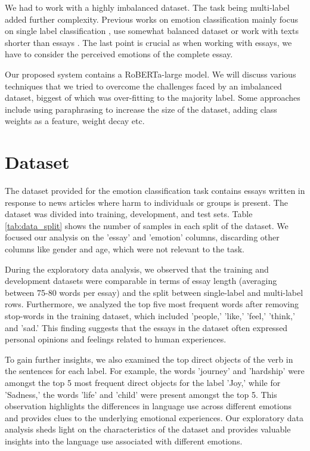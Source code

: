 \documentclass[11pt]{article}
\begin{document}
We had to work with a highly imbalanced dataset. The task being multi-label added further complexity. Previous works on emotion classification mainly focus on single label classification \citep{barriere2022wassa}, use somewhat balanced dataset \citep{demszky2020goemotions} or work with texts shorter than essays \citep{mohammad-2012-emotional}. The last point is crucial as when working with essays, we have to consider the perceived emotions of the complete essay.

Our proposed system contains a RoBERTa-large model. We will discuss various techniques that we tried to overcome the challenges faced by an imbalanced dataset, biggest of which was over-fitting to the majority label. Some approaches include using paraphrasing to increase the size of the dataset, adding class weights as a feature, weight decay etc.

\section{Dataset}

The dataset provided for the emotion classification task contains essays written in response to news articles where harm to individuals or groups is present. The dataset was divided into training, development, and test sets. Table \ref{tab:data_split} shows the number of samples in each split of the dataset. We focused our analysis on the 'essay' and 'emotion' columns, discarding other columns like gender and age, which were not relevant to the task.

During the exploratory data analysis, we observed that the training and development datasets were comparable in terms of essay length (averaging between 75-80 words per essay) and the split between single-label and multi-label rows. Furthermore, we analyzed the top five most frequent words after removing stop-words in the training dataset, which included 'people,' 'like,' 'feel,' 'think,' and 'sad.' This finding suggests that the essays in the dataset often expressed personal opinions and feelings related to human experiences.

To gain further insights, we also examined the top direct objects of the verb in the sentences for each label. For example, the words 'journey' and 'hardship' were amongst the top 5 most frequent direct objects for the label 'Joy,' while for 'Sadness,' the words 'life' and 'child' were present amongst the top 5. This observation highlights the differences in language use across different emotions and provides clues to the underlying emotional experiences. Our exploratory data analysis sheds light on the characteristics of the dataset and provides valuable insights into the language use associated with different emotions.
\end{document}
